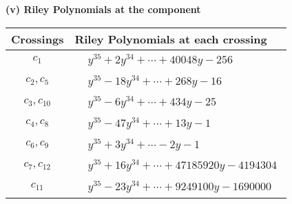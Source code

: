 \documentclass[1p]{elsarticle_modified}
\theoremstyle{definition}
\begin{document}
\flushleft \textbf{(v) Riley Polynomials at the component}\newline \\
\begin{tabular}{m{50pt}|m{274pt}}
Crossings & \hspace{64pt}Riley Polynomials at each crossing \\
\hline $$\begin{aligned}c_{1}\end{aligned}$$&$\begin{aligned}
&y^{35}+2 y^{34}+\cdots+40048 y-256
\end{aligned}$\\
\hline $$\begin{aligned}c_{2},c_{5}\end{aligned}$$&$\begin{aligned}
&y^{35}-18 y^{34}+\cdots+268 y-16
\end{aligned}$\\
\hline $$\begin{aligned}c_{3},c_{10}\end{aligned}$$&$\begin{aligned}
&y^{35}-6 y^{34}+\cdots+434 y-25
\end{aligned}$\\
\hline $$\begin{aligned}c_{4},c_{8}\end{aligned}$$&$\begin{aligned}
&y^{35}-47 y^{34}+\cdots+13 y-1
\end{aligned}$\\
\hline $$\begin{aligned}c_{6},c_{9}\end{aligned}$$&$\begin{aligned}
&y^{35}+3 y^{34}+\cdots-2 y-1
\end{aligned}$\\
\hline $$\begin{aligned}c_{7},c_{12}\end{aligned}$$&$\begin{aligned}
&y^{35}+16 y^{34}+\cdots+47185920 y-4194304
\end{aligned}$\\
\hline $$\begin{aligned}c_{11}\end{aligned}$$&$\begin{aligned}
&y^{35}-23 y^{34}+\cdots+9249100 y-1690000
\end{aligned}$\\
\hline
\end{tabular}\\~\\
\end{document}

